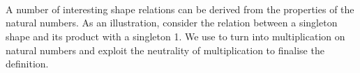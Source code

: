 \begin{code}[hide]%
%
\>[2]\AgdaSpace{}%
\AgdaSpace{}%
\AgdaSpace{}%
\<%
\\
%
\\[\AgdaEmptyExtraSkip]%
%
\>[2]\AgdaSpace{}%
\AgdaSymbol{:}\AgdaSpace{}%
\AgdaSpace{}%
\<%
\\
%
\>[2]\AgdaSpace{}%
\AgdaSymbol{=}\AgdaSpace{}%
\AgdaSpace{}%
\AgdaSymbol{\{}\AgdaSpace{}%
\AgdaSpace{}%
\AgdaSymbol{=}\AgdaSpace{}%
\AgdaSpace{}%
\AgdaSymbol{;}\AgdaSpace{}%
\AgdaSpace{}%
\AgdaSymbol{=}\AgdaSpace{}%
\AgdaSpace{}%
\AgdaSymbol{;}\AgdaSpace{}%
\AgdaSpace{}%
\AgdaSymbol{=}\AgdaSpace{}%
\AgdaSpace{}%
\AgdaSpace{}%
\AgdaSpace{}%
\AgdaSpace{}%
\AgdaSpace{}%
\AgdaSpace{}%
\AgdaSymbol{\}}\<%
\\
%
\\[\AgdaEmptyExtraSkip]%
%
\>[2]\AgdaSpace{}%
\AgdaSymbol{:}\AgdaSpace{}%
\AgdaSpace{}%
\AgdaSymbol{\AgdaUnderscore{}}\AgdaSpace{}%
\AgdaSymbol{\AgdaUnderscore{}}\<%
\\
%
\>[2]\AgdaSpace{}%
\AgdaSymbol{=}\AgdaSpace{}%
\AgdaSpace{}%
\AgdaSymbol{\{}\AgdaSpace{}%
\AgdaSpace{}%
\AgdaSymbol{=}\AgdaSpace{}%
\AgdaSpace{}%
\AgdaSymbol{\}}\<%
\\
%
\\[\AgdaEmptyExtraSkip]%
%
\>[2]\AgdaSpace{}%
\AgdaSpace{}%
\AgdaSymbol{=}\AgdaSpace{}%
\AgdaSpace{}%
\<%
\end{code}
A number of interesting shape relations can be derived from the properties of
the natural numbers. As an illustration, consider the relation between a
singleton shape and its product with a singleton  1. We use  to
turn  into multiplication on natural numbers and exploit the
neutrality of multiplication to finalise the definition.
